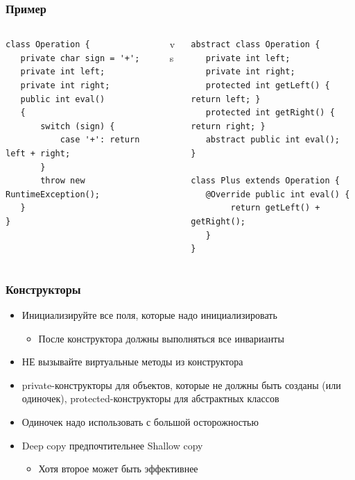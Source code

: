 \documentclass{../../slides-style}
\begin{document}
    \begin{frame}[fragile]
        \frametitle{Пример}
        \begin{footnotesize}
            \begin{columns}
                \begin{column}{0.35\textwidth}
                    \begin{verbatim}
class Operation {
   private char sign = '+';
   private int left;
   private int right;
   public int eval()
   {
       switch (sign) {
           case '+': return left + right;
       }
       throw new RuntimeException();
   }
}
                    \end{verbatim}
                \end{column}
                \begin{column}{0.1\textwidth}
                    vs
                \end{column}
                \begin{column}{0.45\textwidth}
                    \begin{verbatim}
abstract class Operation {
   private int left;
   private int right;
   protected int getLeft() { return left; }
   protected int getRight() { return right; }
   abstract public int eval();
}

class Plus extends Operation {
   @Override public int eval() { 
        return getLeft() + getRight(); 
   }
}
                    \end{verbatim}
                \end{column}
            \end{columns}
        \end{footnotesize}
    \end{frame}

    \begin{frame}
        \frametitle{Конструкторы}
        \begin{itemize}
            \item Инициализируйте все поля, которые надо инициализировать
            \begin{itemize}
                \item После конструктора должны выполняться все инварианты
            \end{itemize}
            \item НЕ вызывайте виртуальные методы из конструктора
            \item private-конструкторы для объектов, которые не должны быть созданы (или одиночек), protected-конструкторы для абстрактных классов
            \item Одиночек надо использовать с большой осторожностью
            \item Deep copy предпочтительнее Shallow copy
            \begin{itemize}
                \item Хотя второе может быть эффективнее
            \end{itemize}
        \end{itemize}
    \end{frame}
\end{document}
